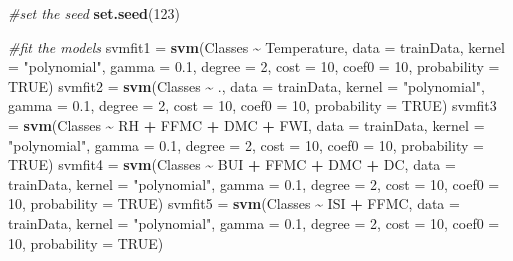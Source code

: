 \documentclass[
]{article}
\newenvironment{Shaded}{\begin{snugshade}}{\end{snugshade}}
\newcommand{\AttributeTok}[1]{\textcolor[rgb]{0.13,0.29,0.53}{#1}}
\newcommand{\CommentTok}[1]{\textcolor[rgb]{0.56,0.35,0.01}{\textit{#1}}}
\newcommand{\ConstantTok}[1]{\textcolor[rgb]{0.56,0.35,0.01}{#1}}
\newcommand{\DecValTok}[1]{\textcolor[rgb]{0.00,0.00,0.81}{#1}}
\newcommand{\FloatTok}[1]{\textcolor[rgb]{0.00,0.00,0.81}{#1}}
\newcommand{\FunctionTok}[1]{\textcolor[rgb]{0.13,0.29,0.53}{\textbf{#1}}}
\newcommand{\NormalTok}[1]{#1}
\newcommand{\OtherTok}[1]{\textcolor[rgb]{0.56,0.35,0.01}{#1}}
\newcommand{\SpecialCharTok}[1]{\textcolor[rgb]{0.81,0.36,0.00}{\textbf{#1}}}
\newcommand{\StringTok}[1]{\textcolor[rgb]{0.31,0.60,0.02}{#1}}
\begin{document}
\begin{Shaded}
\begin{Highlighting}[]
\CommentTok{\#set the seed}
\FunctionTok{set.seed}\NormalTok{(}\DecValTok{123}\NormalTok{)}

\CommentTok{\#fit the models}
\NormalTok{svmfit1 }\OtherTok{=} \FunctionTok{svm}\NormalTok{(Classes }\SpecialCharTok{\textasciitilde{}}\NormalTok{ Temperature, }\AttributeTok{data =}\NormalTok{ trainData, }\AttributeTok{kernel =} \StringTok{"polynomial"}\NormalTok{, }\AttributeTok{gamma =} \FloatTok{0.1}\NormalTok{, }\AttributeTok{degree =} \DecValTok{2}\NormalTok{, }\AttributeTok{cost =} \DecValTok{10}\NormalTok{, }\AttributeTok{coef0 =} \DecValTok{10}\NormalTok{, }\AttributeTok{probability =} \ConstantTok{TRUE}\NormalTok{)}
\NormalTok{svmfit2 }\OtherTok{=} \FunctionTok{svm}\NormalTok{(Classes }\SpecialCharTok{\textasciitilde{}}\NormalTok{ ., }\AttributeTok{data =}\NormalTok{ trainData, }\AttributeTok{kernel =} \StringTok{"polynomial"}\NormalTok{, }\AttributeTok{gamma =} \FloatTok{0.1}\NormalTok{, }\AttributeTok{degree =} \DecValTok{2}\NormalTok{, }\AttributeTok{cost =} \DecValTok{10}\NormalTok{, }\AttributeTok{coef0 =} \DecValTok{10}\NormalTok{, }\AttributeTok{probability =} \ConstantTok{TRUE}\NormalTok{)}
\NormalTok{svmfit3 }\OtherTok{=} \FunctionTok{svm}\NormalTok{(Classes }\SpecialCharTok{\textasciitilde{}}\NormalTok{ RH }\SpecialCharTok{+}\NormalTok{ FFMC }\SpecialCharTok{+}\NormalTok{ DMC }\SpecialCharTok{+}\NormalTok{ FWI, }\AttributeTok{data =}\NormalTok{ trainData, }\AttributeTok{kernel =} \StringTok{"polynomial"}\NormalTok{, }\AttributeTok{gamma =} \FloatTok{0.1}\NormalTok{, }\AttributeTok{degree =} \DecValTok{2}\NormalTok{, }\AttributeTok{cost =} \DecValTok{10}\NormalTok{, }\AttributeTok{coef0 =} \DecValTok{10}\NormalTok{, }\AttributeTok{probability =} \ConstantTok{TRUE}\NormalTok{)}
\NormalTok{svmfit4 }\OtherTok{=} \FunctionTok{svm}\NormalTok{(Classes }\SpecialCharTok{\textasciitilde{}}\NormalTok{ BUI }\SpecialCharTok{+}\NormalTok{ FFMC }\SpecialCharTok{+}\NormalTok{ DMC }\SpecialCharTok{+}\NormalTok{ DC, }\AttributeTok{data =}\NormalTok{ trainData, }\AttributeTok{kernel =} \StringTok{"polynomial"}\NormalTok{, }\AttributeTok{gamma =} \FloatTok{0.1}\NormalTok{, }\AttributeTok{degree =} \DecValTok{2}\NormalTok{, }\AttributeTok{cost =} \DecValTok{10}\NormalTok{, }\AttributeTok{coef0 =} \DecValTok{10}\NormalTok{, }\AttributeTok{probability =} \ConstantTok{TRUE}\NormalTok{)}
\NormalTok{svmfit5 }\OtherTok{=} \FunctionTok{svm}\NormalTok{(Classes }\SpecialCharTok{\textasciitilde{}}\NormalTok{ ISI }\SpecialCharTok{+}\NormalTok{ FFMC, }\AttributeTok{data =}\NormalTok{ trainData, }\AttributeTok{kernel =} \StringTok{"polynomial"}\NormalTok{, }\AttributeTok{gamma =} \FloatTok{0.1}\NormalTok{, }\AttributeTok{degree =} \DecValTok{2}\NormalTok{, }\AttributeTok{cost =} \DecValTok{10}\NormalTok{, }\AttributeTok{coef0 =} \DecValTok{10}\NormalTok{, }\AttributeTok{probability =} \ConstantTok{TRUE}\NormalTok{)}


\end{Highlighting}
\end{Shaded}
\end{document}
